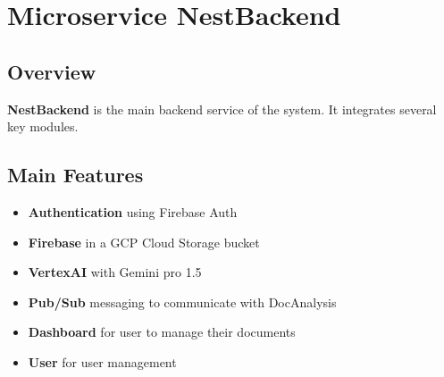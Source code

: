 \chapter{Microservice NestBackend}

\section{Overview}
\textbf{NestBackend} is the main backend service of the system. It integrates several key modules.

\section{Main Features}
\begin{itemize}
    \item \textbf{Authentication} using Firebase Auth
    \item \textbf{Firebase} in a GCP Cloud Storage bucket
    \item \textbf{VertexAI} with Gemini pro 1.5
    \item \textbf{Pub/Sub} messaging to communicate with DocAnalysis
    \item \textbf{Dashboard} for user to manage their documents
    \item \textbf{User} for user management
\end{itemize}










